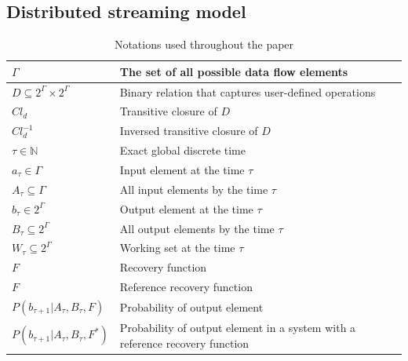 \label{fs-formalism}

\subsection{Distributed streaming model}

\begin{table}[!b]
    \caption{Notations used throughout the paper}
    \begin{tabular}{l|p{5cm}}
        \hline
        $\Gamma$ & The set of all possible data flow elements \\ 
        \hline
        $D\subseteq{2^{\Gamma}\times2^{\Gamma}}$ & Binary relation that captures user-defined operations  \\
        \hline
        $Cl_d$ & Transitive closure of $D$  \\
        \hline
        $Cl^{-1}_d$ & Inversed transitive closure of $D$  \\
        \hline
        $\tau \in \mathbb{N}$ & Exact global discrete time \\
        \hline
        $a_\tau \in \Gamma$ & Input element at the time $\tau$ \\
        \hline
        $A_\tau \subseteq \Gamma$ & All input elements by the time $\tau$ \\
        \hline
        $b_\tau \in 2^{\Gamma}$ & Output element at the time $\tau$ \\
        \hline
        $B_\tau \subseteq 2^{\Gamma}$ & All output elements by the time $\tau$ \\
        \hline
        $W_\tau \subseteq 2^{\Gamma}$ & Working set at the time $\tau$ \\
        \hline
        $F$ & Recovery function \\
        \hline
        $F$ & Reference recovery function \\
        \hline
        $P(b_{\tau+1}|A_{\tau}, B_\tau, F)$ & Probability of output element \\
        \hline
        $P(b_{\tau+1}|A_{\tau}, B_\tau, F^{*})$ & Probability of output element in a system with a reference recovery function \\
    \end{tabular}
    \label{notations}
\end{table}

